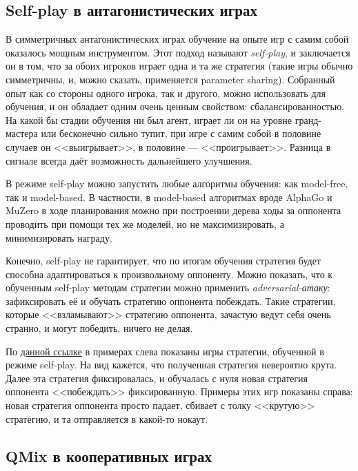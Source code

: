 \subsection{Self-play в антагонистических играх}

В симметричных антагонистических играх обучение на опыте игр с самим собой оказалось мощным инструментом. Этот подход называют \emph{self-play}, и заключается он в том, что за обоих игроков играет одна и та же стратегия (такие игры обычно симметричны, и, можно сказать, применяется parameter sharing). Собранный опыт как со стороны одного игрока, так и другого, можно использовать для обучения, и он обладает одним очень ценным свойством: сбалансированностью. На какой бы стадии обучения ни был агент, играет ли он на уровне гранд-мастера или бесконечно сильно тупит, при игре с самим собой в половине случаев он <<выигрывает>>, в половине --- <<проигрывает>>. Разница в сигнале всегда даёт возможность дальнейшего улучшения.

В режиме self-play можно запустить любые алгоритмы обучения: как model-free, так и model-based. В частности, в model-based алгоритмах вроде AlphaGo и MuZero в ходе планирования можно при построении дерева ходы за оппонента проводить при помощи тех же моделей, но не максимизировать, а минимизировать награду.

Конечно, self-play не гарантирует, что по итогам обучения стратегия будет способна адаптироваться к произвольному оппоненту. Можно показать, что к обученным self-play методам стратегии можно применить \emph{adversarial-атаку}: зафиксировать её и обучать стратегию оппонента побеждать. Такие стратегии, которые <<взламывают>> стратегию оппонента, зачастую ведут себя очень странно, и могут победить, ничего не делая.

\begin{example}
По \href{https://adversarialpolicies.github.io/}{данной ссылке} в примерах слева показаны игры стратегии, обученной в режиме self-play. На вид кажется, что полученная стратегия невероятно крута. Далее эта стратегия фиксировалась, и обучалась с нуля новая стратегия оппонента <<побеждать>> фиксированную. Примеры этих игр показаны справа: новая стратегия оппонента просто падает, сбивает с толку <<крутую>> стратегию, и та отправляется в какой-то нокаут.
\end{example}

\subsection{QMix в кооперативных играх}

